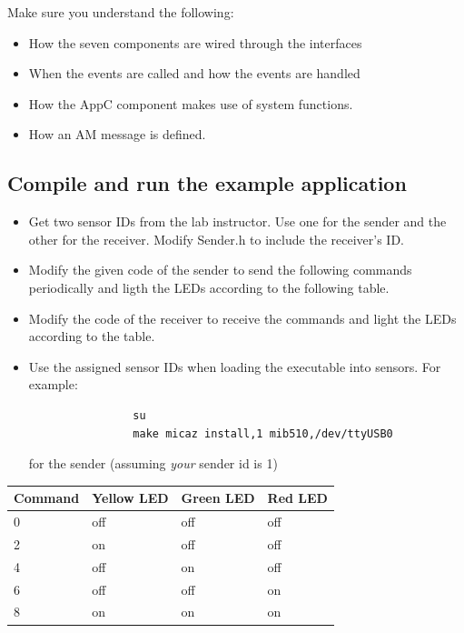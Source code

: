 \documentclass[letterpaper,12pt]{article}
\begin{document}
    Make sure you understand the following:
    \begin{itemize}
        \item How the seven components are wired through the interfaces
        \item When the events are called and how the events are handled
        \item How the AppC component makes use of system functions.
        \item How an AM message is defined.
    \end{itemize}

\subsection*{Compile and run the example application}
    \begin{itemize}
        \item Get two sensor IDs from the lab instructor. Use one for the sender and the other for the receiver. Modify Sender.h to include the receiver's ID.
        \item Modify the given code of the sender to send the following commands periodically and ligth the LEDs according to the following table.
        \item Modify the code of the receiver to receive the commands and light the LEDs according to the table.
        \item Use the assigned sensor IDs when loading the executable into sensors. For example:
            \begin{lstlisting}
                su
                make micaz install,1 mib510,/dev/ttyUSB0
            \end{lstlisting}
            for the sender (assuming \emph{your} sender id is 1)
    \end{itemize}
    \begin{table}[htbp]
    \begin{center}
        \begin{tabular}{ |l|l|l|l| }
            \hline
            \textbf{Command} & \textbf{Yellow LED} & \textbf{Green LED} & \textbf{Red LED} \\ \hline
            0 & off & off & off \\ \hline
            2 & on & off & off \\ \hline
            4 & off & on & off \\ \hline
            6 & off & off & on \\ \hline
            8 & on & on & on \\ \hline
        \end{tabular}
    \end{center}
    \end{table}
\end{document}
